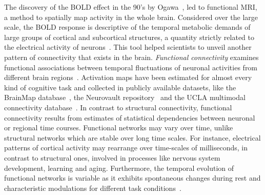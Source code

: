 The discovery of the BOLD effect in the 90's by Ogawa~\cite{ogawa1990}, led to functional MRI, a method to spatially map activity in the whole brain.
Considered over the large scale, the BOLD response is descriptive of the temporal metabolic demands of large groups of cortical and subcortical structures, a quantity strictly related to the electrical activity of neurons~\cite{logothetis2001}.
This tool helped scientists to unveil another pattern of connectivity that exists in the brain. \emph{Functional connectivity} examines functional associations between temporal fluctuations of neuronal activities from different brain regions~\cite{biswal1995}.
Activation maps have been estimated for almost every kind of cognitive task and collected in publicly available datasets, like the BrainMap database~\cite{fox2002}, the Neurovault repository~\cite{gorgolewski2015} and the UCLA multimodal connectivity database~\cite{brown2012}.
In contrast to structural connectivity, functional connectivity results from estimates of statistical dependencies between neuronal or regional time courses.
Functional networks may vary over time, unlike structural networks which are stable over long time scales. For instance, electrical patterns of cortical activity may rearrange over time-scales of milliseconds, in contrast to structural ones, involved in processes like nervous system development, learning and aging.
Furthermore, the temporal evolution of functional networks is variable as it exhibits spontaneous changes during rest and characteristic modulations for different task conditions~\cite{honey2007,hutchison2013}.

